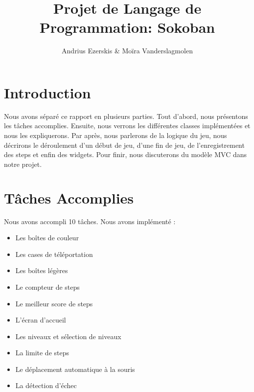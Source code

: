 \documentclass[utf8]{article}
\begin{document}
\begin{titlepage}


\author{Andrius Ezerskis \& Moïra Vanderslagmolen}
\title{Projet de Langage de Programmation: Sokoban}

\maketitle
\end{titlepage}
\begin{large}

\section{Introduction}
\indent
\par
Nous avons séparé ce rapport en plusieurs parties. Tout d'abord, nous présentons
les tâches accomplies. Ensuite, nous verrons les différentes classes
implémentées et nous les expliquerons. Par après, nous parlerons de la logique
du jeu, nous décrirons le déroulement d'un début de jeu, d'une fin de jeu, de
l'enregistrement des steps et enfin des widgets. Pour finir, nous discuterons du
modèle MVC dans notre projet.

\par

\section{Tâches Accomplies}

\par
\indent

Nous avons accompli 10 tâches.
Nous avons implémenté :

\begin{itemize}
    \item Les boîtes de couleur
    \item Les cases de téléportation
    \item Les boîtes légères
    \item Le compteur de steps
    \item Le meilleur score de steps
    \item L'écran d'accueil
    \item Les niveaux et sélection de niveaux 
    \item La limite de steps
    \item Le déplacement automatique à la souris
    \item La détection d'échec
  \end{itemize}


\end{large}
\end{document}
